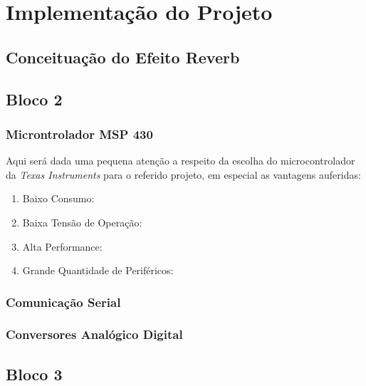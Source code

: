 \chapter{Implementação do Projeto}

\section{Conceituação do Efeito Reverb}

\section{Bloco 2}
	\subsection{Microntrolador MSP 430}
		Aqui será dada uma pequena atenção a respeito da escolha do microcontrolador da \textit{Texas Instruments} para o referido projeto, em especial as vantagens auferidas:
		
		\begin{enumerate}
			\item Baixo Consumo:
			\item Baixa Tensão de Operação:
			\item Alta Performance:
			\item Grande Quantidade de Periféricos:
		\end{enumerate}
	\subsection{Comunicação Serial}
		
	\subsection{Conversores Analógico Digital}
\section{Bloco 3}